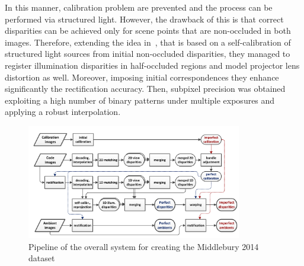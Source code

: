 In this manner, calibration problem are prevented and the process can be performed via structured light.
However, the drawback of this is that correct disparities can be achieved only for scene points that are non-occluded in both images.
Therefore, extending the idea in~\cite{scharstein2003high}, that is based on a self-calibration of structured light sources from initial non-occluded disparities, they managed to register illumination disparities in half-occluded regions and model projector lens distortion as well. 
Moreover, imposing initial correspondences they enhance significantly the rectification accuracy.
Then, subpixel precision was obtained exploiting a high number of binary patterns under multiple exposures and applying a robust interpolation.\\

\begin{figure}[t]
	\begin{center}
		\includegraphics[width=.8\textwidth, height=5cm, keepaspectratio]{images/middlebury-2014-pipeline.png}
		\caption{Pipeline of the overall system for creating the Middlebury 2014 dataset \cite{Scharstein2014}}
		\label{fig:middlebury-pipeline}
	\end{center}
\end{figure}

